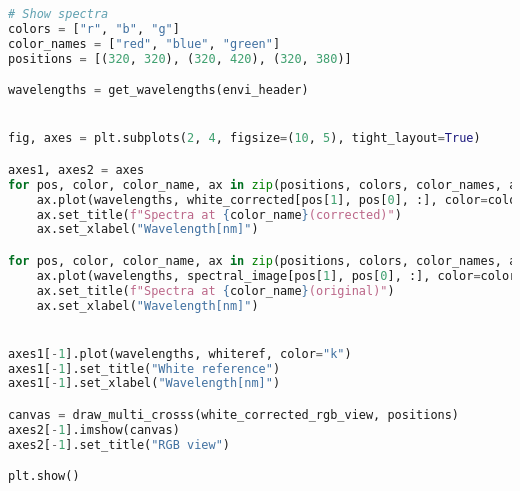 \begin{lstlisting}[language=python, caption=White correction for SpecimIQ with small reference, label={code:wc-specimiq-small}]
# Show spectra
colors = ["r", "b", "g"]
color_names = ["red", "blue", "green"]
positions = [(320, 320), (320, 420), (320, 380)]

wavelengths = get_wavelengths(envi_header)


fig, axes = plt.subplots(2, 4, figsize=(10, 5), tight_layout=True)

axes1, axes2 = axes
for pos, color, color_name, ax in zip(positions, colors, color_names, axes2):
    ax.plot(wavelengths, white_corrected[pos[1], pos[0], :], color=color)
    ax.set_title(f"Spectra at {color_name}(corrected)")
    ax.set_xlabel("Wavelength[nm]")

for pos, color, color_name, ax in zip(positions, colors, color_names, axes1):
    ax.plot(wavelengths, spectral_image[pos[1], pos[0], :], color=color)
    ax.set_title(f"Spectra at {color_name}(original)")
    ax.set_xlabel("Wavelength[nm]")


axes1[-1].plot(wavelengths, whiteref, color="k")
axes1[-1].set_title("White reference")
axes1[-1].set_xlabel("Wavelength[nm]")

canvas = draw_multi_crosss(white_corrected_rgb_view, positions)
axes2[-1].imshow(canvas)
axes2[-1].set_title("RGB view")

plt.show()

\end{lstlisting}